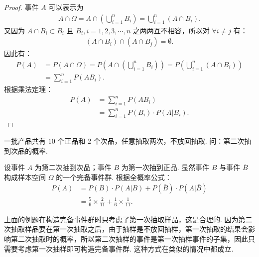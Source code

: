 \documentclass[12pt, a4paper, oneside, UTF8]{ctexbook}
\begin{document}
\begin{proof}
    事件 \(A\) 可以表示为 
    \begin{align*}
        A \cap \Omega = A \cap \left(\bigcup_{i = 1}^{n}B_i\right) = \bigcup_{i = 1}^n \left(A\cap B_i\right).
    \end{align*}
    又因为 \(A\cap B_i \subset B_i\) 且 \(B_i , i = 1 , 2 , 3 , \cdots , n\) 之两两互不相容，所以对 \(\forall i \neq j\) 有：
    \begin{align*}
        \left(A\cap B_i\right) \cap \left(A\cap B_j\right) = \emptyset.
    \end{align*}
    因此有：
    \begin{align*}
        P\left(A\right) &= P\left(A \cap \Omega\right) = P\left(A \cap \left(\bigcup_{i = 1}^{n}B_i\right)\right) = P\left(\bigcup_{i = 1}^n \left(A\cap B_i\right)\right)\\
        &= \sum_{i = 1}^{n} P\left(A B_i\right).
    \end{align*}
    根据乘法定理：
    \begin{align*}
        P\left(A\right) &= \sum_{i = 1}^{n} P\left(A B_i\right) \\ 
        &= \sum_{i = 1}^{n} P\left(B_i\right)\cdot P\left(A | B_i\right).
    \end{align*}
\end{proof}

\begin{example}
    一批产品共有 \(10\) 个正品和 \(2\) 个次品，任意抽取两次，不放回抽取. 问：第二次抽到次品的概率.
\end{example}

\begin{solution}
    设事件 \(A\) 为第二次抽到次品；事件 \(B\) 为第一次抽到正品. 显然事件 \(B\) 与事件 \(\overline{B}\) 构成样本空间 \(\Omega\) 的一个完备事件群. 根据全概率公式：
    \begin{align*}
        P\left(A\right) &= P\left(B\right) \cdot P\left(A | B\right) + P\left(\overline{B}\right) \cdot P\left(A | \overline{B}\right)\\
        &= \frac{5}{6}\times \frac{2}{11} + \frac{1}{6}\times \frac{1}{11}.
    \end{align*}
\end{solution}

\begin{rmk}
    上面的例题在构造完备事件群时只考虑了第一次抽取样品，这是合理的. 因为第二次抽取样品要在第一次抽取之后，由于抽样是不放回抽样，第一次抽取的结果会影响第二次抽取时的概率，所以第二次抽样的事件是第一次抽样事件的子集，因此只需要考虑第一次抽样即可构造完备事件群. 这种方式在类似的情况中都成立.
\end{rmk}
\end{document}
